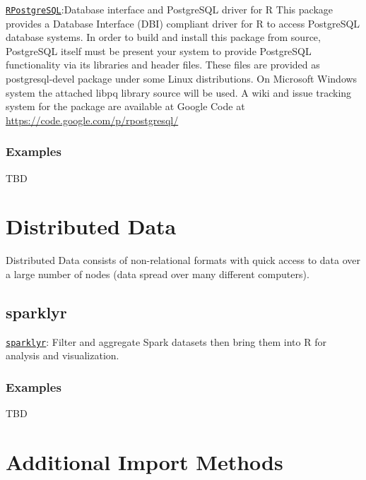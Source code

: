 \documentclass[]{book}
\begin{document}
\href{https://cran.r-project.org/package=RPostgreSQL}{\texttt{RPostgreSQL}}:Database
interface and PostgreSQL driver for R This package provides a Database
Interface (DBI) compliant driver for R to access PostgreSQL database
systems. In order to build and install this package from source,
PostgreSQL itself must be present your system to provide PostgreSQL
functionality via its libraries and header files. These files are
provided as postgresql-devel package under some Linux distributions. On
Microsoft Windows system the attached libpq library source will be used.
A wiki and issue tracking system for the package are available at Google
Code at \url{https://code.google.com/p/rpostgresql/}

\subsubsection{\texorpdfstring{\textbf{Examples
}}{Examples }}\label{examples-7}

TBD

\section{\texorpdfstring{\textbf{Distributed
Data}}{Distributed Data}}\label{distributed-data}

Distributed Data consists of non-relational formats with quick access to
data over a large number of nodes (data spread over many different
computers).

\subsection{\texorpdfstring{\textbf{sparklyr
}}{sparklyr }}\label{sparklyr}

\href{http://spark.rstudio.com/}{\texttt{sparklyr}}: Filter and
aggregate Spark datasets then bring them into R for analysis and
visualization.

\subsubsection{\texorpdfstring{\textbf{Examples
}}{Examples }}\label{examples-8}

TBD

\section{\texorpdfstring{\textbf{Additional Import
Methods}}{Additional Import Methods}}\label{additional-import-methods}
\end{document}
